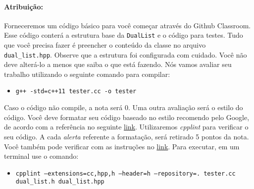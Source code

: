 \documentclass{article}
\begin{document}
\paragraph{Atribuição:} Forneceremos um código básico para você começar através do Github Classroom. Esse código conterá a estrutura base da \texttt{DualList} e o código para testes. Tudo que você precisa fazer é preencher o conteúdo da classe no arquivo \texttt{dual\_list.hpp}. Observe que a estrutura foi configurada com cuidado. Você não deve alterá-lo a menos que saiba o que está fazendo.
%
Nós vamos avaliar seu trabalho utilizando o seguinte comando para compilar:
\begin{itemize}
    \item \texttt{g++ -std=c++11 tester.cc -o tester}
\end{itemize}
Caso o código não compile, a nota será 0.
%
Uma outra avaliação será o estilo do código. Você deve formatar seu código baseado no estilo recomendo pelo  Google, de acordo com a referência no seguinte \href{https://google.github.io/styleguide/cppguide.html}{link}. 
%
Utilizaremos \textit{cpplint} para verificar o seu código. A cada \textit{alerta} referente a formatação, será retirado 5 pontos da nota. Você também pode verificar com as instruções no \href{https://github.com/cpplint/cpplint}{link}. Para executar, em um terminal use o comando:  
\begin{itemize}
    \item \texttt{cpplint --extensions=cc,hpp,h --header=h --repository=. tester.cc dual\_list.h dual\_list.hpp}
\end{itemize}
\end{document}
